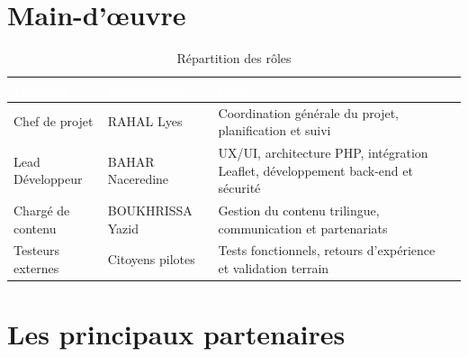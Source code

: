 \documentclass[12pt,a4paper]{report}
\newcommand{\thdcell}[1]{%
  \cellcolor{tabhead}\textbf{\textcolor{white}{#1}}%
}
\begin{document}
\section{Main-d'œuvre}

\begin{table}[H]
  \centering
  \caption{Répartition des rôles}
  \renewcommand{\arraystretch}{1.4}
  \begin{tabularx}{\linewidth}{lllX}
    \toprule
    \rowcolor{primary}
    \thdcell{Fonction} & \thdcell{Responsable} & \thdcell{Rôle} \\
    \midrule

    Chef de projet & RAHAL Lyes &
    Coordination générale du projet, planification et suivi \\

    \rowcolor{lightgray}
    Lead Développeur & BAHAR Naceredine &
    UX/UI, architecture PHP, intégration Leaflet, développement back-end et
    sécurité \\

    Chargé de contenu & BOUKHRISSA Yazid &
    Gestion du contenu trilingue, communication et partenariats \\

    \rowcolor{lightgray}
    Testeurs externes & Citoyens pilotes &
    Tests fonctionnels, retours d'expérience et validation terrain \\

    \bottomrule
  \end{tabularx}
\end{table}

\section{Les principaux partenaires}
\end{document}
